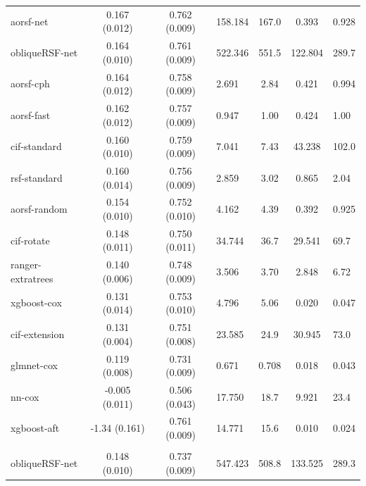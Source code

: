 \documentclass[twoside,11pt]{article}\usepackage[]{graphicx}\usepackage[]{xcolor}
\newenvironment{knitrout}{}{} %
\begin{document}
\begin{knitrout}
\begin{longtable}{lcclccl}
\hline
\hspace{1em}aorsf-net & 0.167 (0.012) & 0.762 (0.009) & 158.184 & 167.0 & 0.393 & 0.928\\
\hspace{1em}obliqueRSF-net & 0.164 (0.010) & 0.761 (0.009) & 522.346 & 551.5 & 122.804 & 289.7\\
\hspace{1em}aorsf-cph & 0.164 (0.012) & 0.758 (0.009) & 2.691 & 2.84 & 0.421 & 0.994\\
\hspace{1em}aorsf-fast & 0.162 (0.012) & 0.757 (0.009) & 0.947 & 1.00 & 0.424 & 1.00\\
\hspace{1em}cif-standard & 0.160 (0.010) & 0.759 (0.009) & 7.041 & 7.43 & 43.238 & 102.0\\
\hspace{1em}rsf-standard & 0.160 (0.014) & 0.756 (0.009) & 2.859 & 3.02 & 0.865 & 2.04\\
\hspace{1em}aorsf-random & 0.154 (0.010) & 0.752 (0.010) & 4.162 & 4.39 & 0.392 & 0.925\\
\hspace{1em}cif-rotate & 0.148 (0.011) & 0.750 (0.011) & 34.744 & 36.7 & 29.541 & 69.7\\
\hspace{1em}ranger-extratrees & 0.140 (0.006) & 0.748 (0.009) & 3.506 & 3.70 & 2.848 & 6.72\\
\hspace{1em}xgboost-cox & 0.131 (0.014) & 0.753 (0.010) & 4.796 & 5.06 & 0.020 & 0.047\\
\hspace{1em}cif-extension & 0.131 (0.004) & 0.751 (0.008) & 23.585 & 24.9 & 30.945 & 73.0\\
\hspace{1em}glmnet-cox & 0.119 (0.008) & 0.731 (0.009) & 0.671 & 0.708 & 0.018 & 0.043\\
\hspace{1em}nn-cox & -0.005 (0.011) & 0.506 (0.043) & 17.750 & 18.7 & 9.921 & 23.4\\
\hspace{1em}xgboost-aft & -1.34 (0.161) & 0.761 (0.009) & 14.771 & 15.6 & 0.010 & 0.024\\
\addlinespace[0.3em]
\hline
\multicolumn{7}{l}{\textit{\textbf{Rotterdam tumor bank; recurrence, n = 2982, p = 11}}}\\
\hline
\hspace{1em}obliqueRSF-net & 0.148 (0.010) & 0.737 (0.009) & 547.423 & 508.8 & 133.525 & 289.3\\

\end{longtable}
\end{knitrout}
\end{document}
